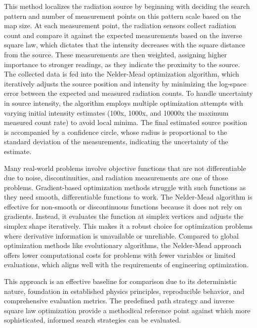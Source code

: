 \documentclass[../report.tex]{subfiles}
\begin{document}
    This method localizes the radiation source by beginning with deciding the search pattern and number of measurement points on this pattern scale based on the map size. At each
    measurement point, the radiation sensors collect radiation count and compare it against the expected measurements based on the inverse square law, which dictates that the intensity 
    decreases with the square distance from the source. These measurements are then weighted, assigning higher importance to stronger readings, as they indicate the proximity 
    to the source. The collected data is fed into the Nelder-Mead optimization algorithm, which iteratively adjusts the source position and intensity by minimizing the log-space error
    between the expected and measured radiation counts. To handle uncertainty in source intensity, the algorithm employs multiple optimization attempts with varying initial intensity estimates 
    (100x, 1000x, and 10000x the maximum measured count rate) to avoid local minima. The final estimated source position is accompanied by a confidence circle, whose radius is proportional to the 
    standard deviation of the measurements, indicating the uncertainty of the estimate.

        
    Many real-world problems involve objective functions that are not differentiable due to noise, discontinuities, and radiation measurements are one of those 
    problems. Gradient-based optimization methods struggle with such functions as they need smooth, differentiable functions to work. The Nelder-Mead algorithm is 
    effective for non-smooth or discontinuous functions because it does not rely on gradients. Instead, it evaluates the function at simplex vertices and adjusts the 
    simplex shape iteratively. This makes it a robust choice for optimization problems where derivative information is unavailable or unreliable. Compared to global optimization methods 
    like evolutionary algorithms, the Nelder-Mead approach offers lower computational costs for problems with fewer variables or limited evaluations, which aligns 
    well with the requirements of engineering optimization. \cite{luersen2004constrained}


    This approach is an effective baseline for comparison due to its deterministic nature, foundation in established physics principles, reproducible 
    behavior, and comprehensive evaluation metrics. The predefined path strategy and inverse square law optimization provide a methodical reference
    point against which more sophisticated, informed search strategies can be evaluated.
    
\end{document}
